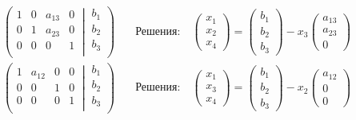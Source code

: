 \documentclass{article}
\begin{document}
\begin{align*}
	\left(\left.
	\begin{matrix}
		1& 0&a_{13}& 0\\
		0& 1&a_{23}& 0\\
		0& 0&0&1\\
	\end{matrix}
	\:\right|\:
	\begin{matrix}
		b_1\\
		b_2\\
		b_3\\
	\end{matrix}
	\right)&\quad
	\text{Решения:}\quad
	\begin{pmatrix}
		x_1\\
		x_2\\
		x_4
	\end{pmatrix}
	=
	\begin{pmatrix}
		b_1\\
		b_2\\
		b_3
	\end{pmatrix}
	-
	x_3
	\begin{pmatrix}
		a_{13}\\
		a_{23}\\
		0
	\end{pmatrix}\\
	\left(\left.
	\begin{matrix}
		1& a_{12}&0& 0\\
		0& 0&1& 0\\
		0& 0&0&1\\
	\end{matrix}
	\:\right|\:
	\begin{matrix}
		b_1\\
		b_2\\
		b_3\\
	\end{matrix}
	\right)&\quad
	\text{Решения:}\quad
	\begin{pmatrix}
		x_1\\
		x_3\\
		x_4
	\end{pmatrix}
	=
	\begin{pmatrix}
		b_1\\
		b_2\\
		b_3
	\end{pmatrix}
	-
	x_2
	\begin{pmatrix}
		a_{12}\\
		0\\
		0
	\end{pmatrix}\\

\end{align*}
\end{document}
